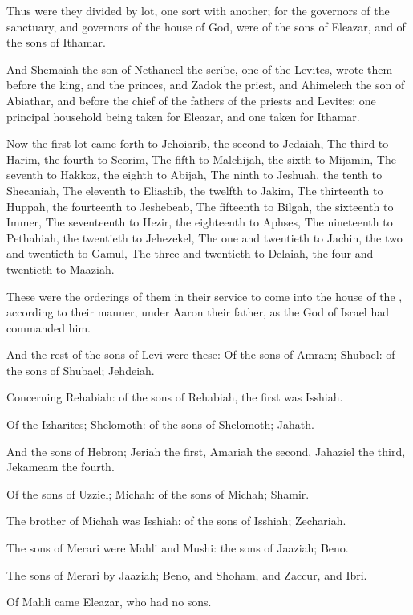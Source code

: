 \Verse Thus were they divided by lot, one sort with another; for the governors of the sanctuary, and governors of the house of God, were of the sons of Eleazar, and of the sons of Ithamar.

\Verse And Shemaiah the son of Nethaneel the scribe, one of the Levites, wrote them before the king, and the princes, and Zadok the priest, and Ahimelech the son of Abiathar, and before the chief of the fathers of the priests and Levites: one principal household being taken for Eleazar, and one taken for Ithamar.

\Verse Now the first lot came forth to Jehoiarib, the second to Jedaiah, \Verse The third to Harim, the fourth to Seorim, \Verse The fifth to Malchijah, the sixth to Mijamin, \Verse The seventh to Hakkoz, the eighth to Abijah, \Verse The ninth to Jeshuah, the tenth to Shecaniah, \Verse The eleventh to Eliashib, the twelfth to Jakim, \Verse The thirteenth to Huppah, the fourteenth to Jeshebeab, \Verse The fifteenth to Bilgah, the sixteenth to Immer, \Verse The seventeenth to Hezir, the eighteenth to Aphses, \Verse The nineteenth to Pethahiah, the twentieth to Jehezekel, \Verse The one and twentieth to Jachin, the two and twentieth to Gamul, \Verse The three and twentieth to Delaiah, the four and twentieth to Maaziah.

\Verse These were the orderings of them in their service to come into the house of the \LORD, according to their manner, under Aaron their father, as the \LORD God of Israel had commanded him.

\Verse And the rest of the sons of Levi were these: Of the sons of Amram; Shubael: of the sons of Shubael; Jehdeiah.

\Verse Concerning Rehabiah: of the sons of Rehabiah, the first was Isshiah.

\Verse Of the Izharites; Shelomoth: of the sons of Shelomoth; Jahath.

\Verse And the sons of Hebron; Jeriah the first, Amariah the second, Jahaziel the third, Jekameam the fourth.

\Verse Of the sons of Uzziel; Michah: of the sons of Michah; Shamir.

\Verse The brother of Michah was Isshiah: of the sons of Isshiah; Zechariah.

\Verse The sons of Merari were Mahli and Mushi: the sons of Jaaziah; Beno.

\Verse The sons of Merari by Jaaziah; Beno, and Shoham, and Zaccur, and Ibri.

\Verse Of Mahli came Eleazar, who had no sons.

